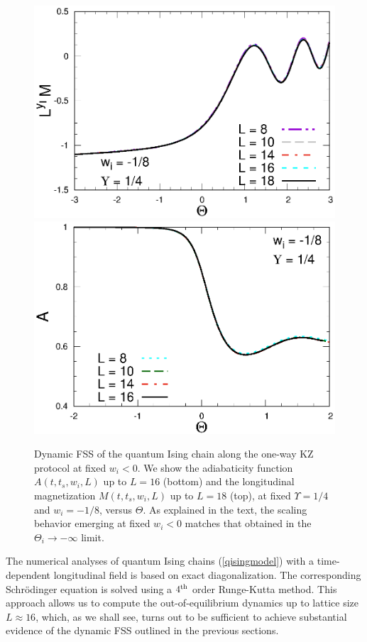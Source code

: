 \begin{figure}[!htb]
\centering
  \includegraphics[width=0.65\columnwidth]{imm/IQY14W18X.eps}
  \includegraphics[width=0.65\columnwidth]{imm/IQY14W18A.eps}
  \caption{ Dynamic FSS of the quantum Ising chain along the one-way
    KZ protocol at fixed $w_i<0$.  We show the adiabaticity function
    $A(t,t_s,w_i,L)$ up to $L=16$ (bottom) and the longitudinal
    magnetization $M(t,t_s,w_i,L)$ up to $L=18$ (top), at fixed
    $\Upsilon=1/4$ and $w_i=-1/8$, versus $\Theta$. As explained in
    the text, the scaling behavior emerging at fixed $w_i<0$ matches
    that obtained in the $\Theta_i\to -\infty$ limit.}
  \label{dfsswi}
\end{figure}

The numerical analyses of quantum Ising chains (\ref{qisingmodel})
with a time-dependent longitudinal field is based on exact
diagonalization. The corresponding Schr\"odinger equation is solved
using a $4^{\rm th}$ order Runge-Kutta method. This approach allows us
to compute the out-of-equilibrium dynamics up to lattice size
$L\approx 16$, which, as we shall see, turns out to be sufficient to
achieve substantial evidence of the dynamic FSS outlined in the
previous sections.



